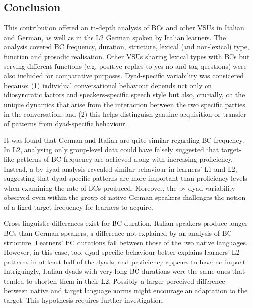 \subsection{Conclusion}
\hypertarget{Toc191305959}{}\begin{styleStandard}
This contribution offered an in-depth analysis of BCs and other VSUs in Italian and German, as well as in the L2 German spoken by Italian learners. The analysis covered BC frequency, duration, structure, lexical (and non-lexical) type, function and prosodic realisation. Other VSUs sharing lexical types with BCs but serving different functions (e.g. positive replies to yes-no and tag questions) were also included for comparative purposes. Dyad-specific variability was considered because: (1) individual conversational behaviour depends not only on idiosyncratic factors and speakers-specific speech style but also, crucially, on the unique dynamics that arise from the interaction between the two specific parties in the conversation; and (2) this helps distinguish genuine acquisition or transfer of patterns from dyad-specific behaviour.
\end{styleStandard}

\begin{styleStandard}
It was found that German and Italian are quite similar regarding BC frequency. In L2, analysing only group-level data could have falsely suggested that target-like patterns of BC frequency are achieved along with increasing proficiency. Instead, a by-dyad analysis revealed similar behaviour in learners’ L1 and L2, suggesting that dyad-specific patterns are more important than proficiency levels when examining the rate of BCs produced. Moreover, the by-dyad variability observed even within the group of native German speakers challenges the notion of a fixed target frequency for learners to acquire.
\end{styleStandard}

\begin{styleStandard}
Cross-linguistic differences exist for BC duration. Italian speakers produce longer BCs than German speakers, a difference not explained by an analysis of BC structure. Learners' BC durations fall between those of the two native languages. However, in this case, too, dyad-specific behaviour better explains learners’ L2 patterns in at least half of the dyads, and proficiency appears to have no impact. Intriguingly, Italian dyads with very long BC durations were the same ones that tended to shorten them in their L2. Possibly, a larger perceived difference between native and target language norms might encourage an adaptation to the target. This hypothesis requires further investigation.
\end{styleStandard}

